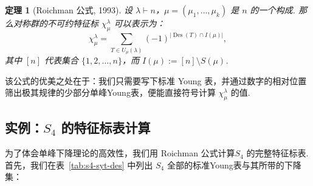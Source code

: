 \documentclass{sjtureport}
\newtheorem{theorem}{定理}[chapter]
\begin{document}
\begin{theorem}[Roichman 公式, 1993]
    设 $\lambda \vdash n$，$\mu=(\mu_1,\dots,\mu_k)$ 是 $n$ 的一个构成. 那么对称群的不可约特征标 $\chi^\lambda_\mu$ 可以表示为：
    \begin{equation}
        \chi^\lambda_\mu = \sum_{T \in U_\mu(\lambda)} (-1)^{|\operatorname{Des}(T) \cap I(\mu)|},
    \end{equation}
    其中 $[n]$ 代表集合 $\{1, 2, \dots, n\}$，而 $I(\mu) := [n] \setminus S(\mu)$. 
\end{theorem}
该公式的优美之处在于：我们只需要写下标准 Young 表，并通过数字的相对位置筛出极其规律的少部分单峰Young表，便能直接符号计算 $\chi^\lambda_\mu$ 的值. 

\subsection{实例：$S_4$ 的特征标表计算}

为了体会单峰下降理论的高效性，我们用 Roichman 公式计算$S_4$ 的完整特征标表. 首先，我们在表~\ref{tab:s4-syt-des} 中列出 $S_4$ 全部的标准Young表与其所带的下降集：
\end{document}

